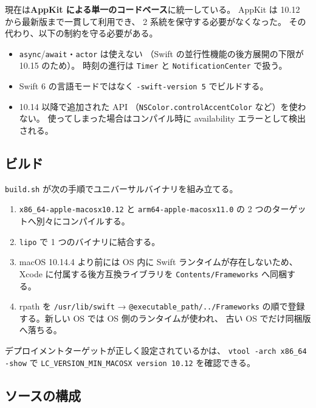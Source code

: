 \documentclass[a4paper,11pt]{ltjsarticle}
\begin{document}
現在は\textbf{AppKit による単一のコードベース}に統一している。
AppKit は 10.12 から最新版まで一貫して利用でき、
2 系統を保守する必要がなくなった。
その代わり、以下の制約を守る必要がある。

\begin{itemize}
  \item \texttt{async}/\texttt{await}・\texttt{actor} は使えない
        （Swift の並行性機能の後方展開の下限が 10.15 のため）。
        時刻の進行は \texttt{Timer} と \texttt{NotificationCenter} で扱う。
  \item Swift 6 の言語モードではなく \texttt{-swift-version 5} でビルドする。
  \item 10.14 以降で追加された API
        （\texttt{NSColor.controlAccentColor} など）を使わない。
        使ってしまった場合はコンパイル時に availability エラーとして検出される。
\end{itemize}

\subsection{ビルド}

\texttt{build.sh} が次の手順でユニバーサルバイナリを組み立てる。

\begin{enumerate}
  \item \texttt{x86\_64-apple-macosx10.12} と \texttt{arm64-apple-macosx11.0}
        の 2 つのターゲットへ別々にコンパイルする。
  \item \texttt{lipo} で 1 つのバイナリに結合する。
  \item macOS 10.14.4 より前には OS 内に Swift ランタイムが存在しないため、
        Xcode に付属する後方互換ライブラリを \texttt{Contents/Frameworks} へ同梱する。
  \item rpath を \texttt{/usr/lib/swift} → \texttt{@executable\_path/../Frameworks}
        の順で登録する。新しい OS では OS 側のランタイムが使われ、
        古い OS でだけ同梱版へ落ちる。
\end{enumerate}

デプロイメントターゲットが正しく設定されているかは、
\texttt{vtool -arch x86\_64 -show} で
\texttt{LC\_VERSION\_MIN\_MACOSX version 10.12} を確認できる。

\subsection{ソースの構成}
\end{document}
